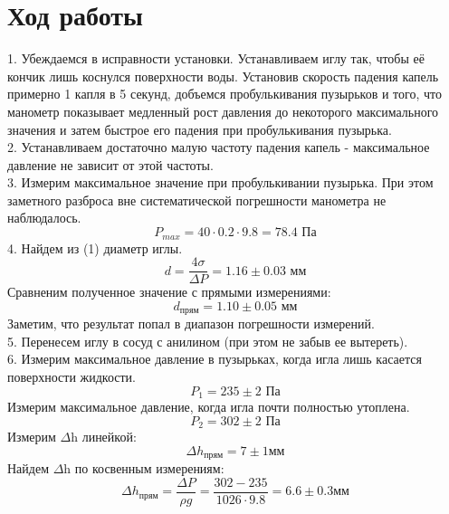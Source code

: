 \documentclass[a4paper]{article}
\begin{document}
	\section{Ход работы}
	1. Убеждаемся в исправности установки. Устанавливаем иглу так, чтобы её кончик лишь коснулся поверхности воды. Установив скорость падения капель примерно 1 капля в 5 секунд, добъемся пробулькивания пузырьков и того, что манометр показывает медленный рост давления до некоторого максимального значения и затем быстрое его падения при пробулькивания пузырька. \\ 
	2. Устанавливаем достаточно малую частоту падения капель - максимальное давление не зависит от этой частоты. \\
	3. Измерим максимальное значение при пробулькивании пузырька. При этом заметного разброса вне систематической погрешности манометра не наблюдалось.  \\
	\begin{equation}
	P_{max} = 40 \cdot 0.2 \cdot 9.8 = 78.4\text{ Па}
	\end{equation}
	4. Найдем из (1) диаметр иглы.
	\begin{equation}
	d=\frac{4\sigma}{\Delta P}=1.16 \pm 0.03\text{ мм}
	\end{equation}
	Сравненим полученное значение с прямыми измерениями:
	\begin{equation}
	d_\text{прям}=1.10 \pm 0.05 \text{ мм}
	\end{equation}
	Заметим, что результат попал в диапазон погрешности измерений. \\
	5. Перенесем иглу в сосуд с анилином (при этом не забыв ее вытереть). \\
	6. Измерим максимальное давление в пузырьках, когда игла лишь касается поверхности жидкости.
	\begin{equation}
	P_1=235 \pm 2 \text{ Па}
	\end{equation}
	Измерим максимальное давление, когда игла почти полностью утоплена.
	\begin{equation}
	P_2=302 \pm 2 \text{ Па}
	\end{equation}
	Измерим $\Delta$h линейкой:
	\begin{equation}
	\Delta h_\text{прям}=7 \pm 1 \text{мм}
	\end{equation}
	Найдем $\Delta$h по косвенным измерениям:
	\begin{equation}
	\Delta h_\text{прям}=\frac{\Delta P}{\rho g}=\frac{302-235}{1026\cdot 9.8}=6.6 \pm 0.3 \text{мм}
	\end{equation}
\end{document}
